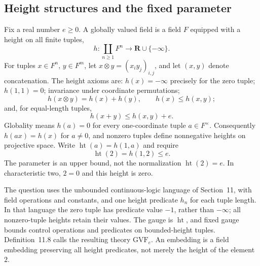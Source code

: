 \documentclass[11pt,a4paper]{article}
\theoremstyle{definition}
\theoremstyle{remark}
\begin{document}
\subsection*{Height structures and the fixed parameter}
Fix a real number $e\geq0$. A globally valued field is a field $F$
equipped with a height on all finite tuples,
\[
 h:\coprod_{n\geq1}F^n\longrightarrow\mathbf R\cup\{-\infty\}.
\]
For tuples $x\in F^n$, $y\in F^m$, let
$x\otimes y=(x_i y_j)_{i,j}$, and let $(x,y)$ denote concatenation.
The height axioms are: $h(x)=-\infty$ precisely for the zero tuple;
$h(1,1)=0$; invariance under coordinate permutations;
\[
 h(x\otimes y)=h(x)+h(y),\qquad h(x)\leq h(x,y);
\]
and, for equal-length tuples,
\[
 h(x+y)\leq h(x,y)+e.
\]
Globality means $h(a)=0$ for every one-coordinate tuple $a\in F^\times$.
Consequently $h(ax)=h(x)$ for $a\ne0$, and nonzero tuples define
nonnegative heights on projective space. Write
$\operatorname{ht}(a)=h(1,a)$ and require
\[
 \operatorname{ht}(2)=h(1,2)\leq e.
\]
The parameter is an upper bound, not the normalization
$\operatorname{ht}(2)=e$. In characteristic two, $2=0$ and this height
is zero.

The question uses the unbounded continuous-logic language of
Section~11, with field operations and constants, and one height
predicate $h_n$ for each tuple length. In that language the zero tuple
has predicate value $-1$, rather than $-\infty$; all nonzero-tuple
heights retain their values. The gauge is $\operatorname{ht}$, and
fixed gauge bounds control operations and predicates on bounded-height
tuples. Definition~11.8 calls the resulting theory
$\mathrm{GVF}_e$. An embedding is a field embedding preserving all
height predicates, not merely the height of the element $2$.
\end{document}

